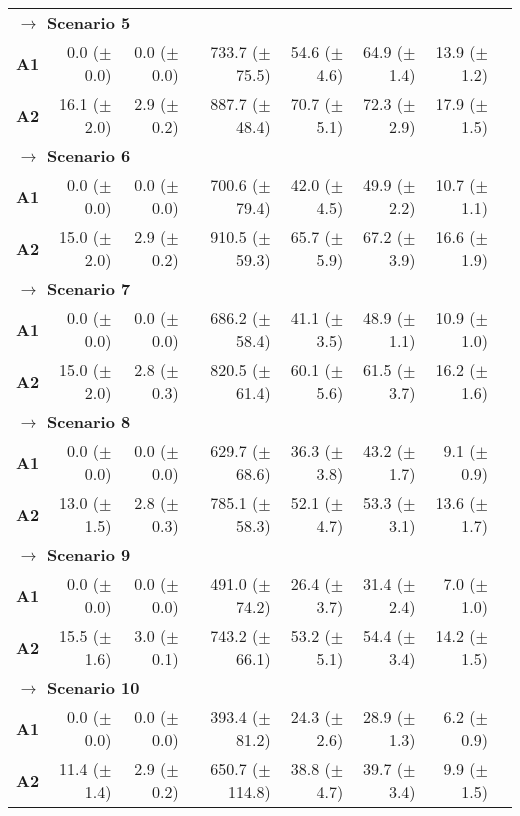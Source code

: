 \begin{table}[ht]
\begin{tabular}{rrrrrrrr}
	\multicolumn{6}{l}{\textbf{$\longrightarrow$ Scenario 5 }} \\
\bf{A1}  & 0.0 ($\pm$0.0)  & 0.0 ($\pm$0.0)  & 733.7 ($\pm$75.5)  & 54.6 ($\pm$4.6)  & 64.9 ($\pm$1.4)  & 13.9 ($\pm$1.2)  \\
\bf{A2}  & 16.1 ($\pm$2.0)  & 2.9 ($\pm$0.2)  & 887.7 ($\pm$48.4)  & 70.7 ($\pm$5.1)  & 72.3 ($\pm$2.9)  & 17.9 ($\pm$1.5)  \\ [1ex]
	
	\multicolumn{6}{l}{\textbf{$\longrightarrow$ Scenario 6 }} \\
\bf{A1}  & 0.0 ($\pm$0.0)  & 0.0 ($\pm$0.0)  & 700.6 ($\pm$79.4)  & 42.0 ($\pm$4.5)  & 49.9 ($\pm$2.2)  & 10.7 ($\pm$1.1)  \\
\bf{A2}  & 15.0 ($\pm$2.0)  & 2.9 ($\pm$0.2)  & 910.5 ($\pm$59.3)  & 65.7 ($\pm$5.9)  & 67.2 ($\pm$3.9)  & 16.6 ($\pm$1.9)  \\ [1ex]
	
	\multicolumn{6}{l}{\textbf{$\longrightarrow$ Scenario 7 }} \\
\bf{A1}  & 0.0 ($\pm$0.0)  & 0.0 ($\pm$0.0)  & 686.2 ($\pm$58.4)  & 41.1 ($\pm$3.5)  & 48.9 ($\pm$1.1)  & 10.9 ($\pm$1.0)  \\
\bf{A2}  & 15.0 ($\pm$2.0)  & 2.8 ($\pm$0.3)  & 820.5 ($\pm$61.4)  & 60.1 ($\pm$5.6)  & 61.5 ($\pm$3.7)  & 16.2 ($\pm$1.6)  \\ [1ex]
	
	\multicolumn{6}{l}{\textbf{$\longrightarrow$ Scenario 8 }} \\
\bf{A1}  & 0.0 ($\pm$0.0)  & 0.0 ($\pm$0.0)  & 629.7 ($\pm$68.6)  & 36.3 ($\pm$3.8)  & 43.2 ($\pm$1.7)  & 9.1 ($\pm$0.9)  \\
\bf{A2}  & 13.0 ($\pm$1.5)  & 2.8 ($\pm$0.3)  & 785.1 ($\pm$58.3)  & 52.1 ($\pm$4.7)  & 53.3 ($\pm$3.1)  & 13.6 ($\pm$1.7)  \\ [1ex]
	
	\multicolumn{6}{l}{\textbf{$\longrightarrow$ Scenario 9 }} \\
\bf{A1}  & 0.0 ($\pm$0.0)  & 0.0 ($\pm$0.0)  & 491.0 ($\pm$74.2)  & 26.4 ($\pm$3.7)  & 31.4 ($\pm$2.4)  & 7.0 ($\pm$1.0)  \\
\bf{A2}  & 15.5 ($\pm$1.6)  & 3.0 ($\pm$0.1)  & 743.2 ($\pm$66.1)  & 53.2 ($\pm$5.1)  & 54.4 ($\pm$3.4)  & 14.2 ($\pm$1.5)  \\ [1ex]
	
	\multicolumn{6}{l}{\textbf{$\longrightarrow$ Scenario 10 }} \\
		
\bf{A1}  & 0.0 ($\pm$0.0)  & 0.0 ($\pm$0.0)  & 393.4 ($\pm$81.2)  & 24.3 ($\pm$2.6)  & 28.9 ($\pm$1.3)  & 6.2 ($\pm$0.9)  \\
\bf{A2}  & 11.4 ($\pm$1.4)  & 2.9 ($\pm$0.2)  & 650.7 ($\pm$114.8)  & 38.8 ($\pm$4.7)  & 39.7 ($\pm$3.4)  & 9.9 ($\pm$1.5)  \\ [1ex]
		\hline
	\end{tabular}
\end{table} 
